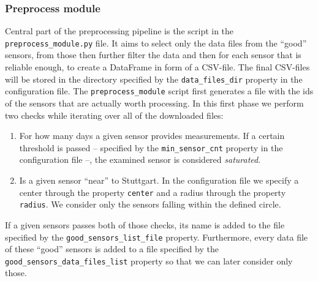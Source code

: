 \documentclass[12pt,a4paper,twoside]{scrartcl}
\numberwithin{equation}{section}
\begin{document}
\subsubsection{Preprocess module}\label{sec:preproc-module}
Central part of the preprocessing pipeline is the script in the \texttt{preprocess\_module.py} file. It aims to select only the data files from the ``good'' sensors, from those then further filter the data and then for each sensor that is reliable enough, to create a DataFrame in form of a CSV-file. The final CSV-files will be stored in the directory specified by the \texttt{data\_files\_dir} property in the configuration file. The \texttt{preprocess\_module} script first generates a file with the ids of the sensors that are actually worth processing. In this first phase we perform two checks while iterating over all of the downloaded files:
\begin{enumerate}
\item For how many days a given sensor provides measurements. If a certain threshold is passed -- specified by the \texttt{min\_sensor\_cnt} property in the configuration file --, the examined sensor is considered \emph{saturated}.
\item Is a given sensor ``near'' to Stuttgart. In the configuration file we specify a center through the property \texttt{center} and a radius through the property \texttt{radius}. We consider only the sensors falling within the defined circle.
\end{enumerate}
If a given sensors passes both of those checks, its name is added to the file specified by the \texttt{good\_sensors\_list\_file} property. Furthermore, every data file of these ``good'' sensors is added to a file specified by the \texttt{good\_sensors\_data\_files\_list} property so that we can later consider only those.
\end{document}
